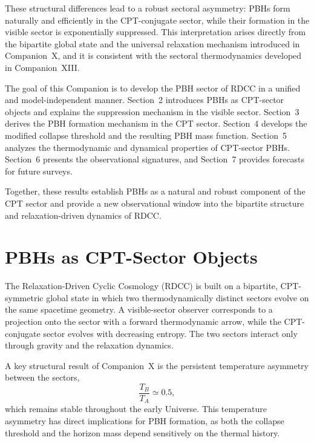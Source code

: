 \documentclass[11pt,a4paper]{article}
\begin{document}
These structural differences lead to a robust sectoral asymmetry: PBHs form naturally and
efficiently in the CPT-conjugate sector, while their formation in the visible sector is exponentially
suppressed. This interpretation arises directly from the bipartite global state and the universal
relaxation mechanism introduced in Companion~X, and it is consistent with the sectoral
thermodynamics developed in Companion~XIII.

The goal of this Companion is to develop the PBH sector of RDCC in a unified and
model-independent manner. Section~2 introduces PBHs as CPT-sector objects and explains the
suppression mechanism in the visible sector. Section~3 derives the PBH formation mechanism in
the CPT sector. Section~4 develops the modified collapse threshold and the resulting PBH mass
function. Section~5 analyzes the thermodynamic and dynamical properties of CPT-sector PBHs.
Section~6 presents the observational signatures, and Section~7 provides forecasts for future
surveys.

Together, these results establish PBHs as a natural and robust component of the CPT sector
and provide a new observational window into the bipartite structure and relaxation-driven
dynamics of RDCC.


\section{PBHs as CPT-Sector Objects}

The Relaxation-Driven Cyclic Cosmology (RDCC) is built on a bipartite, CPT-symmetric global
state in which two thermodynamically distinct sectors evolve on the same spacetime geometry.
A visible-sector observer corresponds to a projection onto the sector with a forward
thermodynamic arrow, while the CPT-conjugate sector evolves with decreasing entropy. The two
sectors interact only through gravity and the relaxation dynamics.

A key structural result of Companion~X is the persistent temperature asymmetry between the
sectors,
\begin{equation}
\frac{T_{B}}{T_{A}} \simeq 0.5,
\end{equation}
which remains stable throughout the early Universe. This temperature asymmetry has direct
implications for PBH formation, as both the collapse threshold and the horizon mass depend
sensitively on the thermal history.
\end{document}
